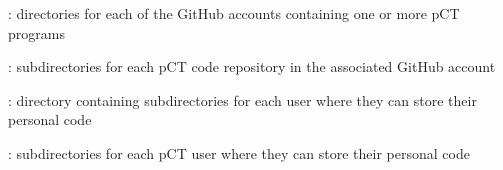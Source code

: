 \begin{tcbenvironment}
\begin{tcbparagraph}
\begin{ThinEnum}[labelindent=1pt, leftmargin=*]
\begin{ThinEnum}[labelindent=1pt, leftmargin=*]
\begin{ThinEnum}[labelindent=1pt, leftmargin=*]
\begin{ThinEnum}[labelindent=1pt, leftmargin=*]
	        		\item {} : directories for each of the GitHub accounts containing one or more pCT programs
				\begin{ThinEnum}[labelindent=1pt, leftmargin=*]
	        			\item {} : subdirectories for each pCT code repository in the associated GitHub account
	    			\end{ThinEnum}
	    		\end{ThinEnum}
			\item {} : directory containing subdirectories for each user where they can store their personal code
	    		\begin{ThinEnum}[labelindent=1pt, leftmargin=*]
	        		\item {} : subdirectories for each pCT user where they can store their personal code
	    		\end{ThinEnum}
		\end{ThinEnum}			
    	\end{ThinEnum}
\end{ThinEnum}
\end{tcbparagraph}
\end{tcbenvironment}
\endinput
